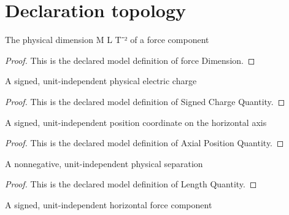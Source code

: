 \section{Declaration topology}
\begin{definition}
  \label{def:physics:phyx-mini-0900:phyxminiproblems-problemphyxmini0900-forcedimension}
  The physical dimension M L T⁻² of a force component
\end{definition}
\begin{proof}
  This is the declared model definition of force Dimension.
\end{proof}
\begin{definition}
  \label{def:physics:phyx-mini-0900:phyxminiproblems-problemphyxmini0900-signedchargequantity}
  A signed, unit-independent physical electric charge
\end{definition}
\begin{proof}
  This is the declared model definition of Signed Charge Quantity.
\end{proof}
\begin{definition}
  \label{def:physics:phyx-mini-0900:phyxminiproblems-problemphyxmini0900-axialpositionquantity}
  A signed, unit-independent position coordinate on the horizontal axis
\end{definition}
\begin{proof}
  This is the declared model definition of Axial Position Quantity.
\end{proof}
\begin{definition}
  \label{def:physics:phyx-mini-0900:phyxminiproblems-problemphyxmini0900-lengthquantity}
  A nonnegative, unit-independent physical separation
\end{definition}
\begin{proof}
  This is the declared model definition of Length Quantity.
\end{proof}
\begin{definition}
  \label{def:physics:phyx-mini-0900:phyxminiproblems-problemphyxmini0900-axialforcecomponentquantity}
  A signed, unit-independent horizontal force component
\end{definition}
